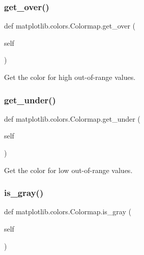 \subsubsection{\texorpdfstring{get\+\_\+over()}{get\_over()}}
{\footnotesize\ttfamily def matplotlib.\+colors.\+Colormap.\+get\+\_\+over (\begin{DoxyParamCaption}\item[{}]{self }\end{DoxyParamCaption})}

\begin{DoxyVerb}Get the color for high out-of-range values.\end{DoxyVerb}
 \mbox{\label{classmatplotlib_1_1colors_1_1Colormap_ae5287c447944154b2061ace2c82402b2}} 
\subsubsection{\texorpdfstring{get\+\_\+under()}{get\_under()}}
{\footnotesize\ttfamily def matplotlib.\+colors.\+Colormap.\+get\+\_\+under (\begin{DoxyParamCaption}\item[{}]{self }\end{DoxyParamCaption})}

\begin{DoxyVerb}Get the color for low out-of-range values.\end{DoxyVerb}
 \mbox{\label{classmatplotlib_1_1colors_1_1Colormap_a16c7de119067241c6ff90ae4f1f88aa3}} 
\subsubsection{\texorpdfstring{is\+\_\+gray()}{is\_gray()}}
{\footnotesize\ttfamily def matplotlib.\+colors.\+Colormap.\+is\+\_\+gray (\begin{DoxyParamCaption}\item[{}]{self }\end{DoxyParamCaption})}

